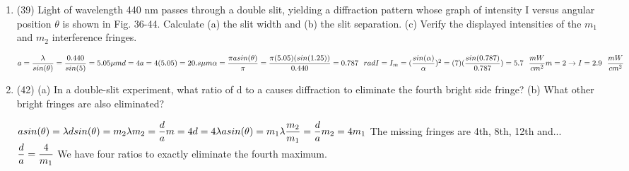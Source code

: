 \documentclass[fleqn]{article}
\begin{document}
\begin{enumerate}
    
    \item (39) Light of wavelength 440 nm passes through a double slit,
    yielding a diffraction pattern whose graph of intensity I versus angular position $\theta$ is shown in Fig. 36-44. Calculate (a) the slit width
    and (b) the slit separation. (c) Verify the displayed intensities of
    the $m_1$ and $m_2$ interference fringes.

      \textcolor{hwColor}{
        $
         a=\dfrac{\lambda}{sin(\theta)}=\dfrac{0.440}{sin(5)}=5.05 \mu m \\
         \\
         d=4a=4(5.05)=20.s \mu m \\
         \\
         \alpha=\dfrac{\pi a sin(\theta)}{\pi}=\dfrac{\pi (5.05)(sin(1.25))}{0.440}=0.787 ~~rad \\
         \\
         I=I_m=(\dfrac{sin(\alpha)}{\alpha})^2=(7)(\dfrac{sin(0.787)}{0.787})=5.7 ~~\dfrac{mW}{cm^2} \\
         \\
         m=2 \rightarrow I=2.9 ~~\dfrac{mW}{cm^2}
        $
      }

    \vfill

    \item (42) (a) In a double-slit experiment, what ratio of d to a
    causes diffraction to eliminate the fourth bright side fringe? (b)
    What other bright fringes are also eliminated?

    \textcolor{hwColor}{
      $
        a sin(\theta)=\lambda \\
        \\
        d sin(\theta)=m_2 \lambda \\
        \\
        m_2=\dfrac{d}{a} \\
        m=4 \\
        \\
        d=4\lambda \\
        \\
        asin(\theta)=m_1 \lambda \\
        \\
        \dfrac{m_2}{m_1}=\dfrac{d}{a} \\ 
        \\
        m_2=4m_1 \\
        \\
      $
      The missing fringes are 4th, 8th, 12th and... \\
      $
        \\
        \dfrac{d}{a}=\dfrac{4}{m_1}
      $
      We have four ratios to exactly eliminate the fourth maximum.
    }



\end{enumerate}
\end{document}
